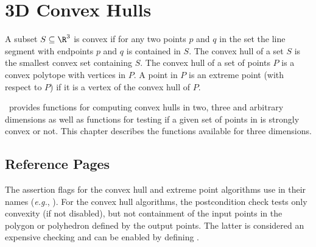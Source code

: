 
\chapter{3D Convex Hulls}
\label{chap:convex_hull_3_ref}

A subset $S \subseteq \R^3$ is convex if for any two points $p$ and $q$
in the set the line segment with endpoints $p$ and $q$ is contained
in $S$. The convex hull of a set $S$ is 
the smallest convex set containing
$S$. The convex hull of a set of points $P$ is a convex 
polytope with vertices in $P$.  A point in $P$ is an extreme point 
(with respect to $P$) if it is a vertex 
of the convex hull of $P$.

\cgal\ provides functions for computing convex hulls in two, three 
and arbitrary dimensions as well as functions for testing if a given set of 
points in is strongly convex or not.  This chapter describes the functions
available for three dimensions. 

\section{Reference Pages}


The assertion flags for the convex hull and extreme point algorithms
use  in their names (\textit{e.g.}, ).
For the convex hull algorithms, the postcondition
check tests only convexity (if not disabled), but not containment of the
input points in the polygon or polyhedron defined by the output points.
The latter is considered an expensive checking and can be enabled by
defining %
.


